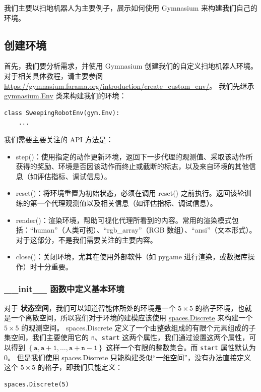 \documentclass[citestyle=gb7714-2015, bibstyle=gb7714-2015,lang=cn,14pt,scheme=chinese]{elegantbook}
\begin{document}
我们主要以扫地机器人为主要例子，展示如何使用 Gymnasium 来构建我们自己的环境。

\subsection{创建环境}

首先，我们要分析需求，并使用 Gymnasium 创建我们的自定义扫地机器人环境。
对于相关具体教程，请主要参阅 \href{https://gymnasium.farama.org/introduction/create_custom_env/}{https://gymnasium.farama.org/introduction/create\_custom\_env/}。
我们先继承 \href{https://gymnasium.farama.org/api/env/#gymnasium.Env}{\textsf{gymnasium.Env}} 类来构建我们的环境：
\begin{verbatim}
class SweepingRobotEnv(gym.Env):
    ...
\end{verbatim}

我们需要主要关注的 API 方法是：
\begin{itemize}
    \item \textsf{step()}：使用指定的动作更新环境，返回下一步代理的观测值、采取该动作所获得的奖励、环境是否因该动作而终止或截断的标志，以及来自环境的其他信息（如评估指标、调试信息）。
    \item \textsf{reset()}：将环境重置为初始状态，必须在调用 \textsf{reset()} 之前执行。返回该轮训练的第一个代理观测值以及相关信息（如评估指标、调试信息）。
    \item \textsf{render()}：渲染环境，帮助可视化代理所看到的内容。常用的渲染模式包括：“human”（人类可视）、“rgb\_array”（RGB 数组）、“ansi”（文本形式）。对于这部分，不是我们需要关注的主要内容。
    \item \textsf{close()}：关闭环境，尤其在使用外部软件（如 pygame 进行渲染，或数据库操作）时十分重要。
\end{itemize}

\subsubsection{\textsf{\_\_init\_\_} 函数中定义基本环境}

对于 \textbf{状态空间}，我们可以知道智能体所处的环境是一个 \(5 \times 5\) 的格子环境，也就是一个离散空间，所以我们对于环境的建模应该使用 \href{https://gymnasium.farama.org/api/spaces/fundamental/#gymnasium.spaces.Discrete}{\textsf{spaces.Discrete}} 来构建一个 \(5 \times 5\) 的观测空间。
\textsf{spaces.Discrete} 定义了一个由整数组成的有限个元素组成的子集空间，我们主要使用它的 \texttt{n}、\texttt{start} 这两个属性，我们通过设置这两个属性，可以得到 \(\left\{ \mathtt{a}, \mathtt{a+1}, \dots, \mathtt{a+n-1} \right\}\) 这样一个有限的整数集合。而 \texttt{start} 属性默认为 \(0\)。
但是我们使用 \textsf{spaces.Discrete} 只能构建类似“一维空间”，没有办法直接定义这个 \(5 \times 5\) 的格子，即我们只能定义：
\begin{verbatim}
spaces.Discrete(5)
\end{verbatim}
\end{document}
